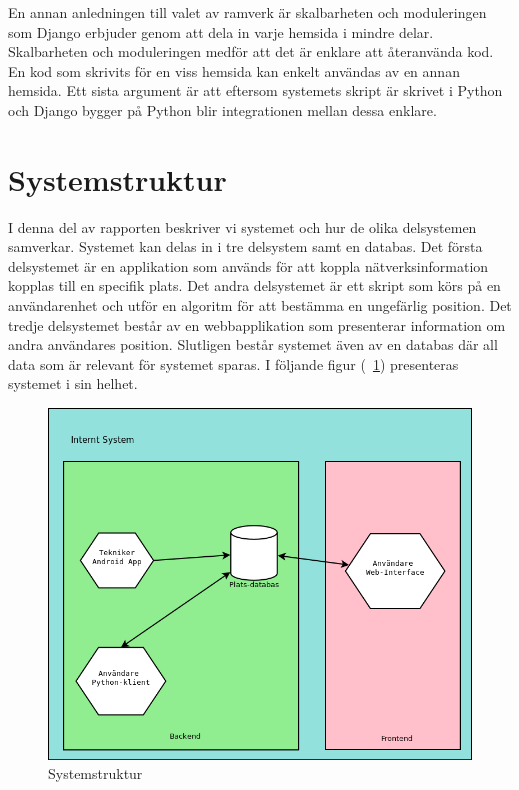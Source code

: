 \documentclass[a4paper,12pt]{article}
\begin{document}
 En annan anledningen till valet av ramverk är skalbarheten och moduleringen som Django erbjuder genom att dela in varje hemsida i mindre delar. Skalbarheten och moduleringen medför att det är enklare att återanvända kod. En kod som skrivits för en viss hemsida kan enkelt användas av en annan hemsida\cite{djangoMVC}. Ett sista argument är att eftersom systemets skript är skrivet i Python och Django bygger på Python blir integrationen mellan dessa enklare.

 \section{Systemstruktur}
 I denna del av rapporten beskriver vi systemet och hur de olika delsystemen samverkar.
 Systemet kan delas in i tre delsystem samt en databas. Det första delsystemet är en applikation som används för att koppla nätverksinformation kopplas till en specifik plats. Det andra delsystemet är ett skript som körs på en användarenhet och utför en algoritm för att bestämma en ungefärlig position. Det tredje delsystemet består av en webbapplikation som presenterar information om andra användares position. Slutligen består systemet även av en databas där all data som är relevant för systemet sparas.
 I följande figur (~\cref{fig:systemStruktur}) presenteras systemet i sin helhet.

 \begin{figure}[H]
 	\includegraphics[width=15cm]{media/systemStruktur.png}
 	\caption{Systemstruktur}
 	\label{fig:systemStruktur}
 \end{figure}
\end{document}
